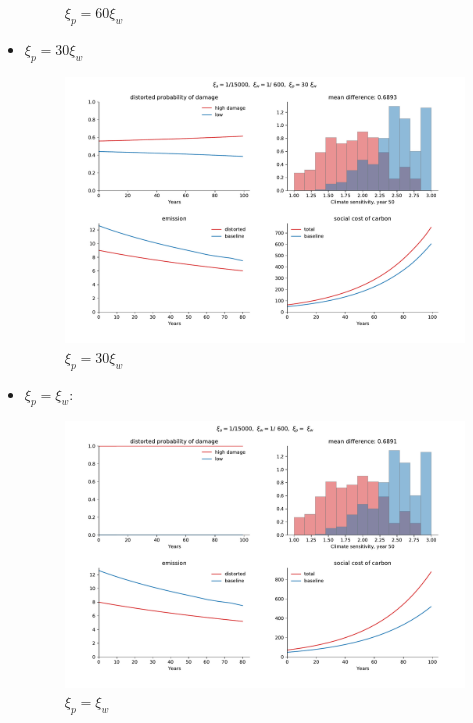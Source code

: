 \documentclass{article}
\begin{document}
\begin{itemize}
\begin{figure}[H]
            \caption{$\xi_p=60\xi_w$}
            \label{fig:notebook/phi_n}
        \end{figure}
        \newpage
\item $\xi_p=30\xi_w$
    \begin{figure}[H]
        \centering
        \includegraphics[width=\linewidth]{notebook/15_600_30.pdf}
        \caption{$\xi_p= 30\xi_w$}
        \label{fig:notebook/phi_x10}
    \end{figure}
    \newpage
\item$\xi_p= \xi_w$:
       \begin{figure}[H]
           \centering
           \includegraphics[width=\linewidth]{notebook/15_600_1.pdf}
           \caption{$\xi_p= \xi_w$}
           \label{fig:notebook/phi_x5}
       \end{figure}
       \newpage
\end{itemize}
\end{document}
